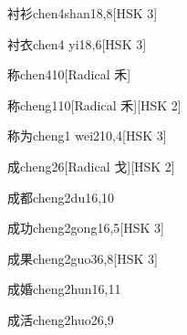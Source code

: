 \begin{entry}{衬衫}{chen4shan1}{8,8}[HSK 3]
\end{entry}

\begin{entry}{衬衣}{chen4 yi1}{8,6}[HSK 3]
\end{entry}

\begin{entry}{称}{chen4}{10}[Radical 禾]
\end{entry}

\begin{entry}{称}{cheng1}{10}[Radical 禾][HSK 2]
\end{entry}

\begin{entry}{称为}{cheng1 wei2}{10,4}[HSK 3]
\end{entry}

\begin{entry}{成}{cheng2}{6}[Radical ⼽][HSK 2]
\end{entry}

\begin{entry}{成都}{cheng2du1}{6,10}
\end{entry}

\begin{entry}{成功}{cheng2gong1}{6,5}[HSK 3]
\end{entry}

\begin{entry}{成果}{cheng2guo3}{6,8}[HSK 3]
\end{entry}

\begin{entry}{成婚}{cheng2hun1}{6,11}
\end{entry}

\begin{entry}{成活}{cheng2huo2}{6,9}
\end{entry}

